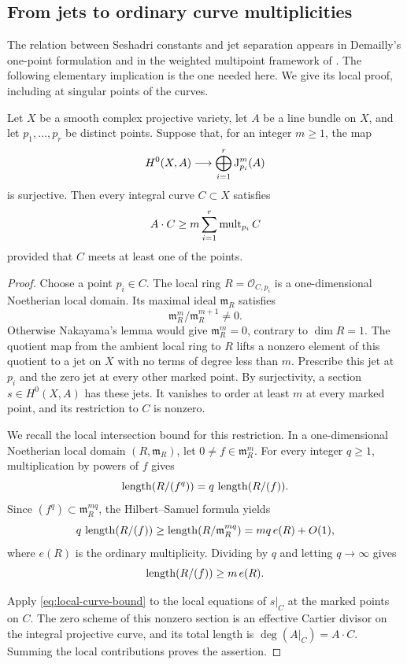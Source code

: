 \subsection{From jets to ordinary curve multiplicities}

The relation between Seshadri constants and jet separation appears in Demailly's one-point formulation \cite[Section~6]{Demailly1992} and in the weighted multipoint framework of \textcite[Section~5]{Ito2013}. The following elementary implication is the one needed here. We give its local proof, including at singular points of the curves.

\begin{lemma}
\label{lem:jets-curves}
Let $X$ be a smooth complex projective variety, let $A$ be a line bundle on $X$, and let $p_1,\ldots,p_r$ be distinct points. Suppose that, for an integer $m\ge1$, the map
\[
 H^0(X,A)\longrightarrow\bigoplus_{i=1}^r\mathrm J_{p_i}^{m}(A)
\]
is surjective. Then every integral curve $C\subset X$ satisfies
\[
 A\cdot C\ge m\sum_{i=1}^r\operatorname{mult}_{p_i}C
\]
provided that $C$ meets at least one of the points.
\end{lemma}

\begin{proof}
Choose a point $p_i\in C$. The local ring $R=\mathcal{O}_{C,p_i}$ is a one-dimensional Noetherian local domain. Its maximal ideal $\mathfrak{m}_R$ satisfies
\[
 \mathfrak{m}_R^m/\mathfrak{m}_R^{m+1}\ne0.
\]
Otherwise Nakayama's lemma would give $\mathfrak{m}_R^m=0$, contrary to $\dim R=1$. The quotient map from the ambient local ring to $R$ lifts a nonzero element of this quotient to a jet on $X$ with no terms of degree less than $m$. Prescribe this jet at $p_i$ and the zero jet at every other marked point. By surjectivity, a section $s\in H^0(X,A)$ has these jets. It vanishes to order at least $m$ at every marked point, and its restriction to $C$ is nonzero.

We recall the local intersection bound for this restriction. In a one-dimensional Noetherian local domain $(R,\mathfrak{m}_R)$, let $0\ne f\in\mathfrak{m}_R^m$. For every integer $q\ge1$, multiplication by powers of $f$ gives
\[
 \operatorname{length}(R/(f^q))=q\,\operatorname{length}(R/(f)).
\]
Since $(f^q)\subset\mathfrak{m}_R^{mq}$, the Hilbert--Samuel formula yields
\[
 q\,\operatorname{length}(R/(f))
 \ge\operatorname{length}(R/\mathfrak{m}_R^{mq})
 =mq\,e(R)+O(1),
\]
where $e(R)$ is the ordinary multiplicity. Dividing by $q$ and letting $q\to\infty$ gives
\begin{equation}
 \label{eq:local-curve-bound}
 \operatorname{length}(R/(f))\ge m\,e(R).
\end{equation}

Apply \eqref{eq:local-curve-bound} to the local equations of $s|_C$ at the marked points on $C$. The zero scheme of this nonzero section is an effective Cartier divisor on the integral projective curve, and its total length is $\deg(A|_C)=A\cdot C$. Summing the local contributions proves the assertion.
\end{proof}


